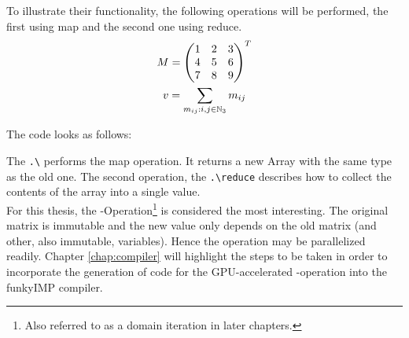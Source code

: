 To illustrate their functionality, the following operations will be performed, the first using map and the second one using reduce.
\begin{gather*}
	M = \begin{pmatrix}
			1 & 2 & 3 \\
			4 & 5 & 6 \\
			7 & 8 & 9
		\end{pmatrix}^T\\
	v = \sum_{m_{ij} : i, j \in \mathbb{N}_3 } m_{ij}
\end{gather*}  

The code looks as follows:



The \verb!.\! performs the map operation. It returns a new Array with the same type as the old one. The second operation, the \verb!.\reduce! describes how to collect the contents of the array into a single value. \\

For this thesis, the -Operation\footnote{Also referred to as a domain iteration in later chapters.} is considered the most interesting. The original matrix is immutable and the new value only depends on the old matrix (and other, also immutable, variables). Hence the operation may be parallelized readily. Chapter \ref{chap:compiler} will highlight the steps to be taken in order to incorporate the generation of code for the GPU-accelerated -operation into the funkyIMP compiler.